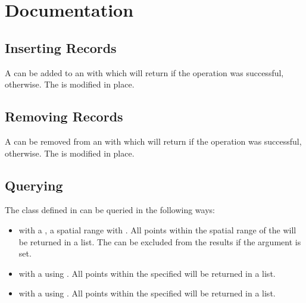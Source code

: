 \documentclass[letterpaper,10pt,english]{sphinxmanual}
\begin{document}
\section{Documentation}
\label{\detokenize{quadtree:documentation}}

\subsection{Inserting Records}
\label{\detokenize{quadtree:inserting-records}}
\sphinxAtStartPar
A  can be added to an  with  which will return  if the operation
was successful,  otherwise. The  is modified in place.


\subsection{Removing Records}
\label{\detokenize{quadtree:removing-records}}
\sphinxAtStartPar
A  can be removed from an  with  which will return  if the operation
was successful,  otherwise. The  is modified in place.


\subsection{Querying}
\label{\detokenize{quadtree:querying}}
\sphinxAtStartPar
The  class defined in  can be queried in the following ways:
\begin{itemize}
\item {}
\sphinxAtStartPar
with a , a spatial range with . All points within the spatial range of the
 will be returned in a list. The  can be excluded from the results if the 
argument is set.

\item {}
\sphinxAtStartPar
with a  using . All points within the specified  will be returned in a list.

\item {}
\sphinxAtStartPar
with a  using . All points within the specified  will be returned in a list.

\end{itemize}
\end{document}
